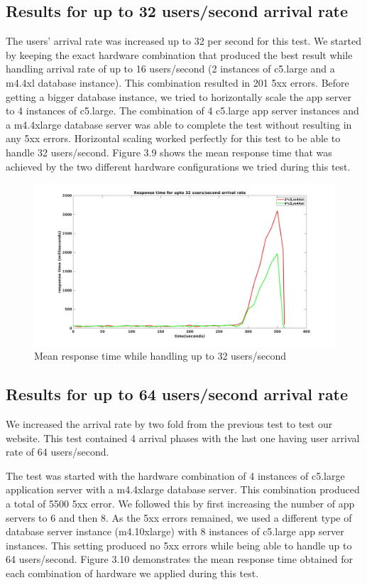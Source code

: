 \subsection{Results for up to 32 users/second arrival rate}
 The users' arrival rate was increased up to 32 per second for this test. We started by keeping the exact hardware combination that produced the best result while handling arrival rate of up to 16 users/second (2 instances of c5.large and a m4.4xl database instance). This combination resulted in 201 5xx errors. Before getting a bigger database instance, we tried to horizontally scale the app server to 4 instances of c5.large. The combination of 4 c5.large app server instances and a m4.4xlarge database server was able to complete the test without resulting in any 5xx errors. Horizontal scaling worked perfectly for this test to be able to handle 32 users/second.
 Figure 3.9 shows the mean response time that was achieved by the two different hardware configurations we tried during this test.

\begin{figure}[h]
	\centering
	\includegraphics[width=1\textwidth]{images/scale32.jpg}
	\caption{Mean response time while handling up to 32 users/second}\label{fig:sqlopt}
\end{figure}


\subsection{Results for up to 64 users/second arrival rate}
We increased the arrival rate by two fold from the previous test to test our website. This test contained 4 arrival phases with the last one having user arrival rate of 64 users/second.  

The test was started with the hardware combination of 4 instances of c5.large application server with a m4.4xlarge database server. This combination produced a total of 5500 5xx error. We followed this by first increasing the number of app servers to 6 and then 8. As the 5xx errors remained, we used a different type of database server instance (m4.10xlarge) with 8 instances of c5.large app server instances. This setting produced no 5xx errors while being able to handle up to 64 users/second. Figure 3.10 demonstrates the mean response time obtained for each combination of hardware we applied during this test.

